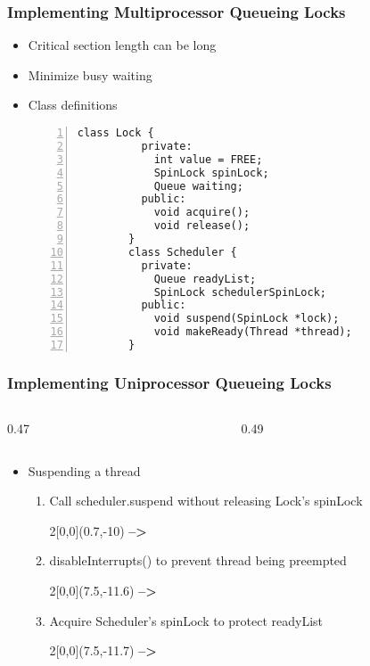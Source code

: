 \documentclass[mathserif,serif,14pt,aspectratio=169]{beamer}
\begin{document}
\begin{frame} [fragile]
	\frametitle{Implementing Multiprocessor Queueing Locks}
	\begin{itemize}\setlength\itemsep{0.5em}
	\item<1-> Critical section length can be long
	\item<1-> Minimize busy waiting
	\item<2-> Class definitions
		{
		\fontsize{8}{8}\selectfont
		\begin{lstlisting}[style=cstyle, gobble=8, frame=single, 
							numbers=left, numberstyle=\ttfamily]
		class Lock {
		  private:
			int value = FREE;
			SpinLock spinLock;
			Queue waiting;
		  public:
			void acquire();
			void release();
		}
		class Scheduler {
		  private:
			Queue readyList;
			SpinLock schedulerSpinLock;
		  public:
			void suspend(SpinLock *lock);
			void makeReady(Thread *thread);
		}
		\end{lstlisting}
		}
	\end{itemize}
\end{frame}

\begin{frame} [fragile]
	\frametitle{Implementing Uniprocessor Queueing Locks}
	{
	\fontsize{7}{7}\selectfont
	\begin{columns}
		\begin{column}{0.47\textwidth}
		
		\end{column}
		\begin{column}{0.49\textwidth}
		
		\end{column}
	\end{columns}
	}
	{
	\fontsize{12}{12}\selectfont
	\begin{itemize}
	\item<2-> Suspending a thread
		\begin{enumerate}
		\fontsize{10}{10}\selectfont
		\item<3-> Call scheduler.suspend without releasing Lock's spinLock
			\begin{textblock}{2}[0,0](0.7,-10)
				{\color{red} \textbf{-->}}	%
			\end{textblock}
		\item<4-> disableInterrupts() to prevent thread being preempted
			\begin{textblock}{2}[0,0](7.5,-11.6)
				{\color{red} \textbf{-->}}	%
			\end{textblock}
		\item<5-> Acquire Scheduler's spinLock to protect readyList
			\begin{textblock}{2}[0,0](7.5,-11.7)
				{\color{red} \textbf{-->}}	%
			\end{textblock}
		\end{enumerate}
	\end{itemize}
	}
\end{frame}
\end{document}

